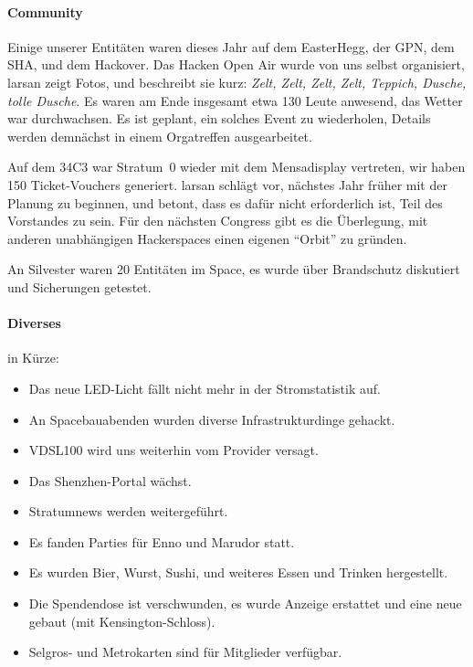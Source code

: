 \documentclass{s0minutes}
\begin{document}
\paragraph{Community}

Einige unserer Entitäten waren dieses Jahr auf dem EasterHegg, der GPN, dem SHA,
und dem Hackover. Das Hacken Open Air wurde von uns selbst organisiert, larsan
zeigt Fotos, und beschreibt sie kurz: \emph{Zelt, Zelt, Zelt, Zelt, Teppich,
Dusche, tolle Dusche}. Es waren am Ende insgesamt etwa 130 Leute anwesend, das
Wetter war durchwachsen. Es ist geplant, ein solches Event zu wiederholen,
Details werden demnächst in einem Orgatreffen ausgearbeitet.

Auf dem 34C3 war Stratum~0 wieder mit dem Mensadisplay vertreten, wir haben 150
Ticket-Vouchers generiert. larsan schlägt vor, nächstes Jahr früher mit der
Planung zu beginnen, und betont, dass es dafür nicht erforderlich ist, Teil des
Vorstandes zu sein.
Für den nächsten Congress gibt es die Überlegung, mit anderen unabhängigen
Hackerspaces einen eigenen "`Orbit"' zu gründen.

An Silvester waren 20 Entitäten im Space, es wurde über Brandschutz diskutiert
und Sicherungen getestet.

\paragraph{Diverses} in Kürze:

\begin{itemize}
  \item Das neue LED-Licht fällt nicht mehr in der Stromstatistik auf.
  \item An Spacebauabenden wurden diverse Infrastrukturdinge gehackt.
  \item VDSL100 wird uns weiterhin vom Provider versagt.
  \item Das Shenzhen-Portal wächst.
  \item Stratumnews werden weitergeführt.
  \item Es fanden Parties für Enno und Marudor statt.
  \item Es wurden Bier, Wurst, Sushi, und weiteres Essen und Trinken hergestellt.
  \item Die Spendendose ist verschwunden, es wurde Anzeige erstattet und eine
    neue gebaut (mit Kensington-Schloss).
  \item Selgros- und Metrokarten sind für Mitglieder verfügbar.
\end{itemize}
\end{document}
